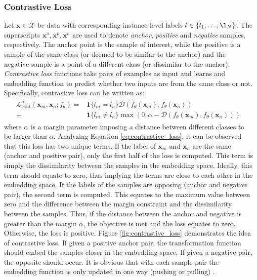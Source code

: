 	\subsubsection{Contrastive Loss}
	Let $\bm{x} \in \mathcal{X}$ be data with corresponding instance-level labels $l \in \{l_{1}, \dots, \l_{N} \}$.  The superscripts $\bm{x}^{a}, \bm{x}^{p}, \bm{x}^{n}$ are used to denote \textit{anchor}, \textit{positive} and \textit{negative} samples, respectively.  The anchor point is the sample of interest, while the positive is a sample of the same class (or deemed to be similar to the anchor) and the negative sample is a point of a different class (or dissimilar to the anchor).
	\textit{Contrastive loss} functions take pairs of examples as input and learns and embedding function to predict whether two inputs are from the same class or not.  Specifically, contrastive loss can be written as:
	\begin{align}
		\begin{split}
		\mathcal{L}^{\alpha}_{\text{cont}}(\bm{x}_{m},\bm{x}_{n};f_{\theta}) = &\bm{1}\{l_{m}=l_{n} \} \mathcal{D}(f_{\theta}(\bm{x}_{m}),f_{\theta}(\bm{x}_{n}))\\ + &\bm{1}\{l_{m} \neq l_{n} \} \max(0,\alpha - \mathcal{D}(f_{\theta}(\bm{x}_{m}),f_{\theta}(\bm{x}_{n})))
		\end{split}
	\label{eq:contrastive_loss}
	\end{align}
	\noindent
	where $\alpha$ is a margin parameter imposing a distance between different classes to be larger than $\alpha$.  Analyzing Equation \ref{eq:contrastive_loss}, it can be observed that this loss has two unique terms.  If the label of $\bm{x}_{m}$ and $\bm{x}_{n}$ are the same (anchor and positive pair), only the first half of the loss is computed.  This term is simply the dissimilarity between the samples in the embedding space.  Ideally, this term should equate to zero, thus implying the terms are close to each other in the embedding space.  If the labels of the samples are opposing (anchor and negative pair), the second term is computed.  This equates to the maximum value between zero and the difference between the margin constraint and the dissimilarity between the samples.  Thus, if the distance between  the anchor and negative is greater than the margin $\alpha$, the objective is met and the loss equates to zero.  Otherwise, the loss is positive.  Figure \ref{fig:contrastive_loss} demonstrates the idea of contrastive loss.  If given a positive anchor pair, the transformation function should embed the samples closer in the embedding space.  If given a negative pair, the opposite should occur.  It is obvious that with each sample pair the embedding function is only updated in one way (pushing or pulling) \citep{Sohn2016NPairLoss,Koch2015SiameseNetworks}.  
	
